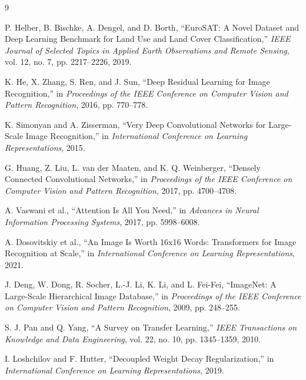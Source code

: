 \documentclass[11pt]{report}
\begin{document}
\begin{thebibliography}{9}

P. Helber, B. Bischke, A. Dengel, and D. Borth,
``EuroSAT: A Novel Dataset and Deep Learning Benchmark for Land Use and Land Cover Classification,''
\emph{IEEE Journal of Selected Topics in Applied Earth Observations and Remote Sensing}, vol. 12, no. 7, pp. 2217--2226, 2019.

K. He, X. Zhang, S. Ren, and J. Sun,
``Deep Residual Learning for Image Recognition,''
in \emph{Proceedings of the IEEE Conference on Computer Vision and Pattern Recognition}, 2016, pp. 770--778.

K. Simonyan and A. Zisserman,
``Very Deep Convolutional Networks for Large-Scale Image Recognition,''
in \emph{International Conference on Learning Representations}, 2015.

G. Huang, Z. Liu, L. van der Maaten, and K. Q. Weinberger,
``Densely Connected Convolutional Networks,''
in \emph{Proceedings of the IEEE Conference on Computer Vision and Pattern Recognition}, 2017, pp. 4700--4708.

A. Vaswani et al.,
``Attention Is All You Need,''
in \emph{Advances in Neural Information Processing Systems}, 2017, pp. 5998--6008.

A. Dosovitskiy et al.,
``An Image Is Worth 16x16 Words: Transformers for Image Recognition at Scale,''
in \emph{International Conference on Learning Representations}, 2021.

J. Deng, W. Dong, R. Socher, L.-J. Li, K. Li, and L. Fei-Fei,
``ImageNet: A Large-Scale Hierarchical Image Database,''
in \emph{Proceedings of the IEEE Conference on Computer Vision and Pattern Recognition}, 2009, pp. 248--255.

S. J. Pan and Q. Yang,
``A Survey on Transfer Learning,''
\emph{IEEE Transactions on Knowledge and Data Engineering}, vol. 22, no. 10, pp. 1345--1359, 2010.

I. Loshchilov and F. Hutter,
``Decoupled Weight Decay Regularization,''
in \emph{International Conference on Learning Representations}, 2019.

\end{thebibliography}
\end{document}
